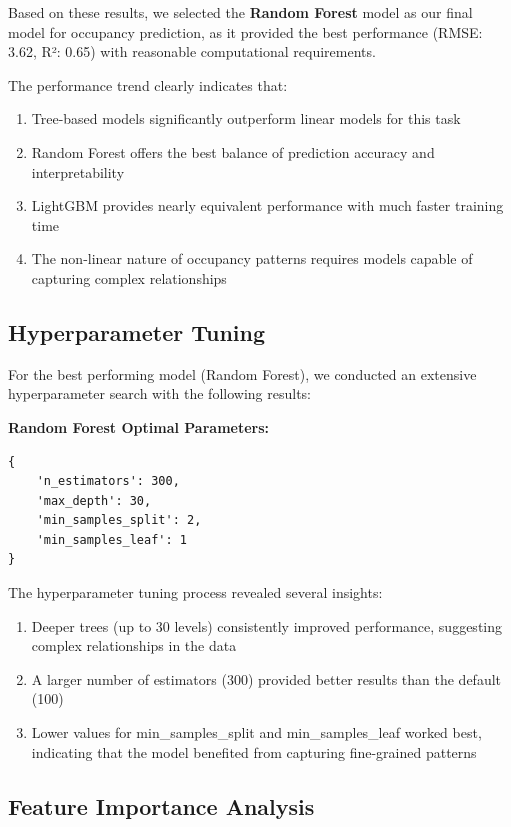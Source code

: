 \documentclass[12pt,letterpaper]{article}
\begin{document}
Based on these results, we selected the \textbf{Random Forest} model as our final model for occupancy prediction, as it provided the best performance (RMSE: 3.62, R²: 0.65) with reasonable computational requirements.

The performance trend clearly indicates that:

\begin{enumerate}
    \item Tree-based models significantly outperform linear models for this task
    \item Random Forest offers the best balance of prediction accuracy and interpretability
    \item LightGBM provides nearly equivalent performance with much faster training time
    \item The non-linear nature of occupancy patterns requires models capable of capturing complex relationships
\end{enumerate}

\subsection{Hyperparameter Tuning}

For the best performing model (Random Forest), we conducted an extensive hyperparameter search with the following results:

\textbf{Random Forest Optimal Parameters:}
\begin{verbatim}
{
    'n_estimators': 300,
    'max_depth': 30,
    'min_samples_split': 2,
    'min_samples_leaf': 1
}
\end{verbatim}

The hyperparameter tuning process revealed several insights:
\begin{enumerate}
    \item Deeper trees (up to 30 levels) consistently improved performance, suggesting complex relationships in the data
    \item A larger number of estimators (300) provided better results than the default (100)
    \item Lower values for min\_samples\_split and min\_samples\_leaf worked best, indicating that the model benefited from capturing fine-grained patterns
\end{enumerate}

\subsection{Feature Importance Analysis}
\end{document}
